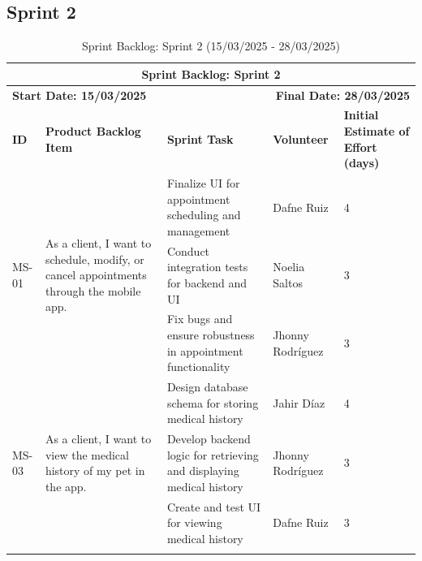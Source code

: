 \documentclass[a4paper,12pt]{report}
\begin{document}
	
	\subsection{Sprint 2}
	\begin{longtable}{|p{2cm}|p{4cm}|p{5cm}|p{3cm}|p{2cm}|} 
		\hline
		\multicolumn{5}{|c|}{\textbf{Sprint Backlog: Sprint 2}} \\
		\hline
		\multicolumn{2}{|l|}{\textbf{Start Date: 15/03/2025}} & \multicolumn{3}{r|}{\textbf{Final Date: 28/03/2025}} \\
		\hline
		\textbf{ID} & \textbf{Product Backlog Item} & \textbf{Sprint Task} & \textbf{Volunteer} & \textbf{Initial Estimate of Effort (days)} \\
		\hline
		\multirow{3}{*}{MS-01} 
		& \multirow{3}{4cm}{As a client, I want to schedule, modify, or cancel appointments through the mobile app.}
		& Finalize UI for appointment scheduling and management & Dafne Ruiz & 4 \\
		\cline{3-5}
		& & Conduct integration tests for backend and UI & Noelia Saltos & 3 \\
		\cline{3-5}
		& & Fix bugs and ensure robustness in appointment functionality & Jhonny Rodríguez & 3 \\
		\hline
		\multirow{3}{*}{MS-03}
		& \multirow{3}{4cm}{As a client, I want to view the medical history of my pet in the app.}
		& Design database schema for storing medical history & Jahir Díaz & 4 \\
		\cline{3-5}
		& & Develop backend logic for retrieving and displaying medical history & Jhonny Rodríguez & 3 \\
		\cline{3-5}
		& & Create and test UI for viewing medical history & Dafne Ruiz & 3 \\
		\hline
		\caption{Sprint Backlog: Sprint 2 (15/03/2025 - 28/03/2025)}
	\end{longtable}
	
	
\end{document}
